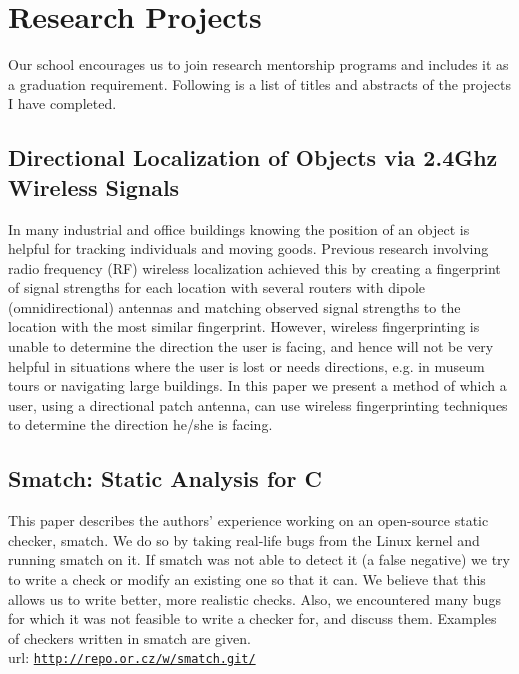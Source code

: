\documentclass[letterpaper]{article}
\begin{document}
\section*{Research Projects}


Our school encourages us to join research mentorship programs and includes it as a graduation requirement. Following is a list of titles and abstracts of the projects I have completed.


  \subsection*{Directional Localization of Objects via 2.4Ghz Wireless Signals}
In many industrial and office buildings knowing the position of an object is helpful for tracking individuals and moving goods. Previous research involving radio frequency (RF) wireless localization achieved this by creating a fingerprint of signal strengths for each location with several routers with dipole (omnidirectional) antennas and matching observed signal strengths to the location with the most similar fingerprint. However, wireless fingerprinting is unable to determine the direction the user is facing, and hence will not be very helpful in situations where the user is lost or needs directions, e.g. in museum tours or navigating large buildings. In this paper we present a method of which a user, using a directional patch antenna, can use wireless fingerprinting techniques to determine the direction he/she is facing.


  \subsection*{Smatch: Static Analysis for C}
This paper describes the authors' experience working on an open-source static checker, smatch. We do so by taking real-life bugs from the Linux kernel and running smatch on it. If smatch was not able to detect it (a false negative) we try to write a check or modify an existing one so that it can. We believe that this allows us to write better, more realistic checks. Also, we encountered many bugs for which it was not feasible to write a checker for, and discuss them. Examples of checkers written in smatch are given.
  \\
  url: \href{http://repo.or.cz/w/smatch.git}{\tt http://repo.or.cz/w/smatch.git/}
\end{document}
